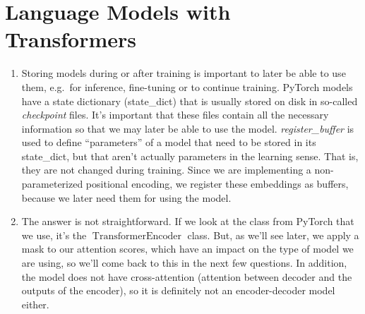 \documentclass[11pt,a4paper]{article}
\newcommand\op[1]{\operatorname{#1}}
\begin{document}
\section{Language Models with Transformers}

\begin{enumerate}[label=(\alph*)]
    \item Storing models during or after training is important to later be
          able to use them, e.g.\ for inference, fine-tuning or to continue
          training.
          PyTorch models have a state dictionary (state\_dict) that is
          usually stored on disk in so-called \emph{checkpoint} files.
          It's important that these files contain all the necessary
          information so that we may later be able to use the model.
          \emph{register\_buffer} is used to define ``parameters'' of a model
          that need to be stored in its state\_dict, but that aren't actually
          parameters in the learning sense.
          That is, they are not changed during training.
          Since we are implementing a non-parameterized positional encoding,
          we register these embeddings as buffers, because we later need
          them for using the model.
    \item The answer is not straightforward.
          If we look at the class from PyTorch that we use, it's the
          $\op{TransformerEncoder}$ class.
          But, as we'll see later, we apply a mask to our attention scores,
          which have an impact on the type of model we are using, so we'll come
          back to this in the next few questions.
          In addition, the model does not have cross-attention (attention
          between decoder and the outputs of the encoder), so it is definitely
          not an encoder-decoder model either.


\end{enumerate}
\end{document}
